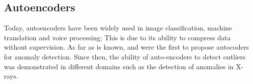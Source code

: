 \subsection{Autoencoders}

Today, autoencoders have been widely used in image classification, machine translation and voice processing; This is due to its ability to compress data without supervision. As far as is known,  and  were the first to propose autocoders for anomaly detection. Since then, the ability of auto-encoders to detect outliers was demonstrated in different domains such as the detection of anomalies in X-rays.

\vspace{5mm} %

